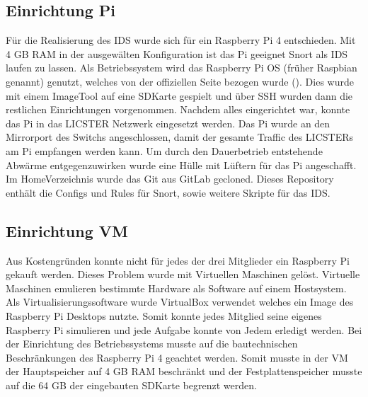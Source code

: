 \documentclass[letterpaper,10pt,ngerman]{sphinxmanual}
\begin{document}
\subsection{Einrichtung Pi}
\label{\detokenize{ids:einrichtung-pi}}
Für die Realisierung des IDS wurde sich für ein Raspberry Pi 4 entschieden. Mit 4 GB RAM in der ausgewälten Konfiguration ist das Pi geeignet Snort als IDS laufen zu lassen. Als Betriebssystem wird das Raspberry Pi OS (früher Raspbian genannt) genutzt, welches von der offiziellen Seite bezogen wurde (). Dies wurde mit einem Image\sphinxhyphen{}Tool auf eine SD\sphinxhyphen{}Karte gespielt und über SSH wurden dann die restlichen Einrichtungen vorgenommen. Nachdem alles eingerichtet war, konnte das Pi in das LICSTER Netzwerk eingesetzt werden. Das Pi wurde an den Mirrorport des Switchs angeschlossen, damit der gesamte Traffic des LICSTERs am Pi empfangen werden kann. Um durch den Dauerbetrieb entstehende Abwärme entgegenzuwirken wurde eine Hülle mit Lüftern für das Pi angeschafft. Im Home\sphinxhyphen{}Verzeichnis wurde das Git aus GitLab gecloned. Dieses Repository enthält die Configs und Rules für Snort, sowie weitere Skripte für das IDS.

\noindent{}


\subsection{Einrichtung VM}
\label{\detokenize{ids:einrichtung-vm}}
Aus Kostengründen konnte nicht für jedes der drei Mitglieder ein Raspberry Pi gekauft werden. Dieses Problem wurde mit Virtuellen Maschinen gelöst. Virtuelle Maschinen emulieren bestimmte Hardware als Software auf einem Hostsystem. Als Virtualisierungssoftware wurde VirtualBox verwendet welches ein Image des Raspberry Pi Desktops nutzte. Somit konnte jedes Mitglied seine eigenes Raspberry Pi simulieren und jede Aufgabe konnte von Jedem erledigt werden. Bei der Einrichtung des Betriebssystems musste auf die bautechnischen Beschränkungen des Raspberry Pi 4 geachtet werden. Somit musste in der VM der Hauptspeicher auf 4 GB RAM beschränkt und der Festplattenspeicher musste auf die 64 GB der eingebauten SD\sphinxhyphen{}Karte begrenzt werden.
\end{document}
